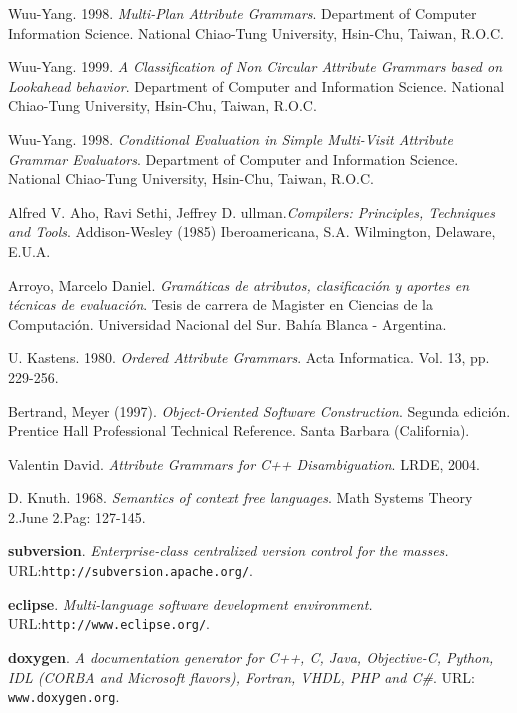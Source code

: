 
\begin{thebibliography}{10}

 Wuu-Yang. 1998. \textit{Multi-Plan Attribute Grammars}. Department of Computer Information Science. National Chiao-Tung University, Hsin-Chu, Taiwan, R.O.C.

 Wuu-Yang. 1999. \textit{A Classification of Non Circular Attribute Grammars based on Lookahead behavior}. Department of Computer and Information Science. National Chiao-Tung University, Hsin-Chu, Taiwan, R.O.C.

 Wuu-Yang. 1998. \textit{Conditional Evaluation in Simple Multi-Visit Attribute Grammar Evaluators}. Department of Computer and Information Science. National
Chiao-Tung University, Hsin-Chu, Taiwan, R.O.C.

 Alfred V. Aho, Ravi Sethi, Jeffrey D. ullman.\textit{Compilers: Principles, Techniques and Tools}. Addison-Wesley (1985)  Iberoamericana, S.A. Wilmington, Delaware, E.U.A.

 Arroyo, Marcelo Daniel. \textit{Gramáticas de atributos, clasificación y aportes en técnicas de evaluación}. Tesis de carrera de Magister en Ciencias de la Computación. Universidad Nacional del Sur. Bahía Blanca - Argentina.

 U. Kastens. 1980. \textit{Ordered Attribute Grammars}. Acta Informatica. Vol. 13, pp. 229-256.

 Bertrand, Meyer (1997). \textit{Object-Oriented Software Construction}. Segunda edición. Prentice Hall Professional Technical Reference. Santa Barbara (California).

 Valentin David. \textit{Attribute Grammars for C++ Disambiguation}. LRDE, 2004.

 D. Knuth. 1968. \textit{Semantics of context free languages}. Math Systems Theory 2.June 2.Pag: 127-145.


 \textbf{subversion}. \textit{Enterprise-class centralized version control for the masses.} URL:\texttt{http://subversion.apache.org/}.

 \textbf{eclipse}. \textit{Multi-language software development environment.} URL:\texttt{http://www.eclipse.org/}.

 \textbf{doxygen}. \textit{A documentation generator for C++, C, Java, Objective-C, Python, IDL (CORBA and Microsoft flavors), Fortran, VHDL, PHP and C\#}. URL: \texttt{www.doxygen.org}.


\end{thebibliography}
